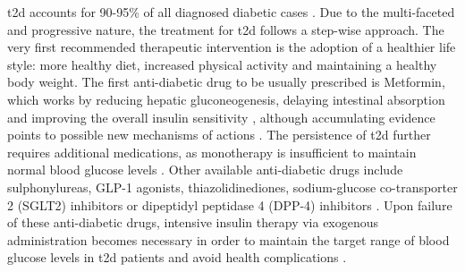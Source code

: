 \par \gls{t2d} accounts for 90-95\% of all diagnosed diabetic cases \textbf{\cite{home_idf_nodate,banday_pathophysiology_2020,elsayed_2_2022}}. Due to the multi-faceted and progressive nature, the treatment for \gls{t2d} follows a step-wise approach. The very first recommended therapeutic intervention is the adoption of a healthier life style: more healthy diet, increased physical activity and maintaining a healthy body weight. The first anti-diabetic drug to be usually prescribed is Metformin, which works by reducing hepatic gluconeogenesis, delaying intestinal absorption and improving the overall insulin sensitivity \textbf{\cite{kaneto_multifaceted_2021}}, although accumulating evidence points to possible new mechanisms of actions \textbf{\cite{foretz_metformin_2023}}. The persistence of \gls{t2d} further requires additional medications, as monotherapy is insufficient to maintain normal blood glucose levels \textbf{\cite{home_idf_nodate,nathan_medical_2009}}. Other available anti-diabetic drugs include sulphonylureas, GLP-1 agonists, thiazolidinediones, sodium-glucose co-transporter 2 (SGLT2) inhibitors or dipeptidyl peptidase 4 (DPP-4) inhibitors \textbf{\cite{home_idf_nodate,nathan_medical_2009,american_diabetes_association_8_2017}}. Upon failure of these anti-diabetic drugs, intensive insulin therapy via exogenous administration becomes necessary in order to maintain the target range of blood glucose levels in \gls{t2d} patients and avoid health complications \textbf{\cite{home_idf_nodate}}.




